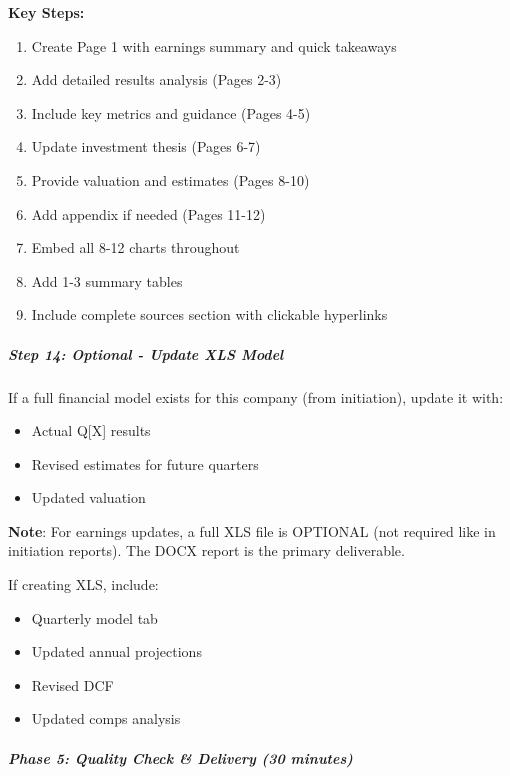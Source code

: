 \documentclass[11pt]{article}
\begin{document}
\textbf{Key Steps:}

\begin{enumerate}[leftmargin=*,itemsep=2pt,topsep=2pt]
\item {} Create Page 1 with earnings summary and quick takeaways
\item {} Add detailed results analysis (Pages 2-3)
\item {} Include key metrics and guidance (Pages 4-5)
\item {} Update investment thesis (Pages 6-7)
\item {} Provide valuation and estimates (Pages 8-10)
\item {} Add appendix if needed (Pages 11-12)
\item {} Embed all 8-12 charts throughout
\item {} Add 1-3 summary tables
\item {} Include complete sources section with clickable hyperlinks
\end{enumerate}

\subparagraph{Step 14: Optional - Update XLS Model}\mbox{}\par

If a full financial model exists for this company (from initiation), update it with:

\begin{itemize}[leftmargin=*,itemsep=2pt,topsep=2pt]
\item {} Actual Q[X] results
\item {} Revised estimates for future quarters
\item {} Updated valuation
\end{itemize}

\textbf{Note}: For earnings updates, a full XLS file is OPTIONAL (not required like in initiation reports). The DOCX report is the primary deliverable.


If creating XLS, include:

\begin{itemize}[leftmargin=*,itemsep=2pt,topsep=2pt]
\item {} Quarterly model tab
\item {} Updated annual projections
\item {} Revised DCF
\item {} Updated comps analysis
\end{itemize}

\subparagraph{Phase 5: Quality Check \& Delivery (30 minutes)}\mbox{}\par
\end{document}

